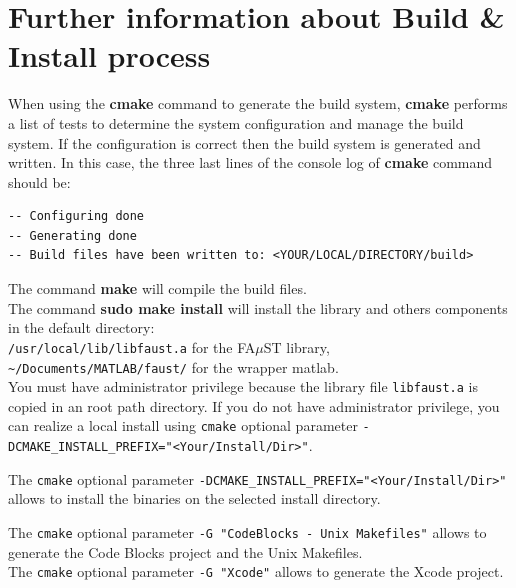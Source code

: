 \section{Further information about Build \& Install process}\label{sec:ANNEXEInfoBuildInstall}
When using the \textbf{cmake} command to generate the build system, \textbf{cmake} performs a list of tests to determine the system configuration and manage the build system. If the configuration is correct then the build system is generated and written. In this case, the three last lines of the console log of \textbf{cmake} command should be:
\begin{lstlisting}[backgroundcolor=\color{white}]
-- Configuring done 
-- Generating done 
-- Build files have been written to: <YOUR/LOCAL/DIRECTORY/build>
\end{lstlisting}

The command \textbf{make} will compile the build files.\\

The command \textbf{sudo make install} will install the library and others components in the default directory: \\
\texttt{/usr/local/lib/libfaust.a} for the FA$\mu$ST library, \\
\texttt{\textasciitilde /Documents/MATLAB/faust/} for the wrapper matlab.\\
You must have administrator privilege because the library file \texttt{libfaust.a} is copied in an root path directory. If you do not have administrator privilege, you can realize a local install using \texttt{cmake} optional parameter \texttt{-DCMAKE\_INSTALL\_PREFIX="<Your/Install/Dir>"}. 

The \texttt{cmake} optional parameter \texttt{-DCMAKE\_INSTALL\_PREFIX="<Your/Install/Dir>"} allows to install the binaries on the selected install directory. 

The \texttt{cmake} optional parameter \texttt{-G "CodeBlocks - Unix Makefiles"} allows to generate the Code Blocks project and the Unix Makefiles.\\ 
The \texttt{cmake} optional parameter \texttt{-G "Xcode"} allows to generate the Xcode project. 




